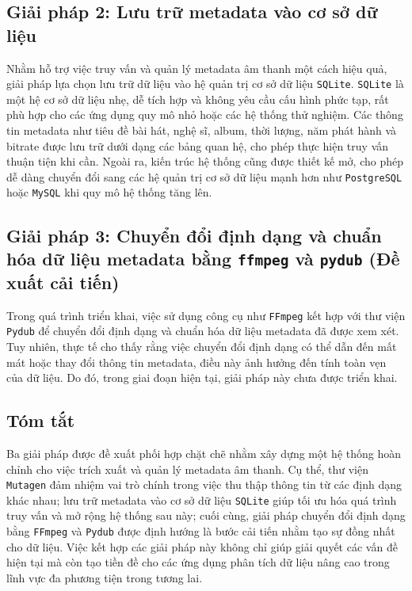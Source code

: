 \documentclass[conference]{IEEEtran}
\begin{document}
\subsection{Giải pháp 2: Lưu trữ metadata vào cơ sở dữ liệu}

Nhằm hỗ trợ việc truy vấn và quản lý metadata âm thanh một cách hiệu quả,
 giải pháp lựa chọn lưu trữ dữ liệu vào hệ quản trị cơ sở dữ liệu \texttt{SQLite}.
  \texttt{SQLite} là một hệ cơ sở dữ liệu nhẹ, dễ tích hợp và không yêu cầu cấu hình phức tạp,
   rất phù hợp cho các ứng dụng quy mô nhỏ hoặc các hệ thống thử nghiệm. Các thông tin metadata
    như tiêu đề bài hát, nghệ sĩ, album, thời lượng, năm phát hành và bitrate được lưu trữ dưới dạng các bảng quan hệ,
     cho phép thực hiện truy vấn thuận tiện khi cần. Ngoài ra, kiến trúc hệ thống cũng được thiết kế mở, cho phép dễ dàng
      chuyển đổi sang các hệ quản trị cơ sở dữ liệu mạnh hơn như \texttt{PostgreSQL} hoặc \texttt{MySQL} khi quy mô hệ thống tăng lên.

\subsection{Giải pháp 3: Chuyển đổi định dạng và chuẩn hóa dữ liệu metadata bằng \texttt{ffmpeg} và \texttt{pydub} (Đề xuất cải tiến)}
Trong quá trình triển khai, việc sử dụng công cụ như \texttt{FFmpeg} kết hợp với thư viện \texttt{Pydub}
 để chuyển đổi định dạng và chuẩn hóa dữ liệu metadata đã được xem xét. Tuy nhiên, thực tế cho thấy rằng
  việc chuyển đổi định dạng có thể dẫn đến mất mát hoặc thay đổi thông tin metadata, điều này ảnh hưởng
   đến tính toàn vẹn của dữ liệu. Do đó, trong giai đoạn hiện tại, giải pháp này chưa được triển khai.
\subsection{Tóm tắt}
Ba giải pháp được đề xuất phối hợp chặt chẽ nhằm xây dựng một hệ thống hoàn chỉnh cho việc trích xuất
 và quản lý metadata âm thanh. Cụ thể, thư viện \texttt{Mutagen} đảm nhiệm vai trò chính trong việc thu thập
  thông tin từ các định dạng khác nhau; lưu trữ metadata vào cơ sở dữ liệu \texttt{SQLite} giúp tối ưu hóa quá trình 
   truy vấn và mở rộng hệ thống sau này; cuối cùng, giải pháp chuyển đổi định dạng bằng 
  \texttt{FFmpeg} và \texttt{Pydub} được định hướng là bước cải tiến nhằm tạo sự đồng nhất cho dữ liệu.
   Việc kết hợp các giải pháp này không chỉ giúp giải quyết các vấn đề hiện tại mà còn tạo tiền đề 
   cho các ứng dụng phân tích dữ liệu nâng cao trong lĩnh vực đa phương tiện
   trong tương lai.
\end{document}
